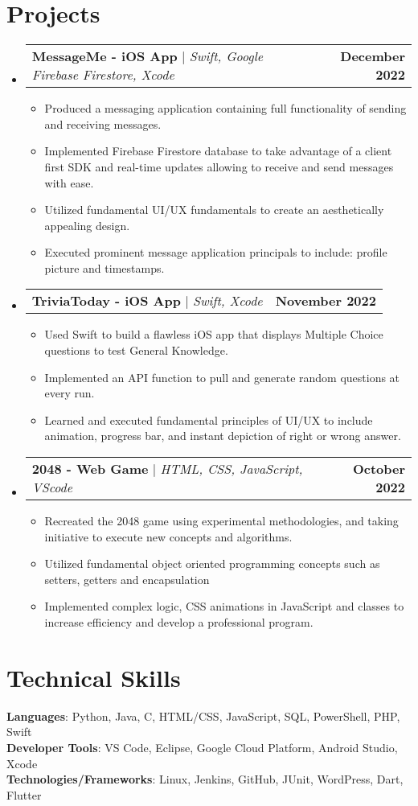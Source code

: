 \documentclass[letterpaper,11pt]{article}
\makeatletter
\newcommand{\resumeItem}[1]{
  \item\small{
    {#1 \vspace{-2pt}}
  }
}
\newcommand{\resumeProjectHeading}[2]{
    \item
    \begin{tabular*}{1.001\textwidth}{l@{\extracolsep{\fill}}r}
      \small#1 & \textbf{\small #2}\\
    \end{tabular*}\vspace{-7pt}
}
\newcommand{\resumeSubHeadingListStart}{\begin{itemize}[leftmargin=0.0in, label={}]}
\newcommand{\resumeSubHeadingListEnd}{\end{itemize}}
\newcommand{\resumeItemListStart}{\begin{itemize}}
\newcommand{\resumeItemListEnd}{\end{itemize}\vspace{-5pt}}
\makeatother
\begin{document}
\section{Projects}
    \vspace{-5pt}
    \resumeSubHeadingListStart
      \resumeProjectHeading
          {\textbf{MessageMe - iOS App} $|$ \emph{Swift, Google Firebase Firestore, Xcode}}{December 2022}
          \resumeItemListStart
            \resumeItem{Produced a messaging application containing full functionality of sending and receiving messages.}
            \resumeItem{Implemented Firebase Firestore database to take advantage of a client first SDK and real-time updates allowing to receive and send messages with ease.}
            \resumeItem{Utilized fundamental UI/UX fundamentals to create an aesthetically appealing design. }
            \resumeItem{Executed prominent message application principals to include: profile picture and timestamps.}
          \resumeItemListEnd
          \vspace{-13pt}
      \resumeProjectHeading
          {\textbf{TriviaToday - iOS App} $|$ \emph{Swift, Xcode}}{November 2022}
          \resumeItemListStart
            \resumeItem{Used Swift to build a flawless iOS app that displays Multiple Choice questions to test General Knowledge.}
            \resumeItem{Implemented an API function to pull and generate random questions at every run.}
            \resumeItem{Learned and executed fundamental principles of UI/UX to include animation, progress bar, and instant
depiction of right or wrong answer.}
          \resumeItemListEnd 
          \vspace{-13pt}
          \resumeProjectHeading
          {\textbf{2048 - Web Game} $|$ \emph{HTML, CSS, JavaScript, VScode}}{October 2022}
          \resumeItemListStart
            \resumeItem{Recreated the 2048 game using experimental methodologies, and taking initiative to execute new concepts
and algorithms.}
            \resumeItem{Utilized fundamental object oriented programming concepts such as setters, getters and encapsulation}
            \resumeItem{Implemented complex logic, CSS animations in JavaScript and classes to increase efficiency and develop a
professional program.}
          \resumeItemListEnd 
    \resumeSubHeadingListEnd
\vspace{-15pt}


%
\section{Technical Skills}
 \begin{itemize}[leftmargin=0.15in, label={}]
    \small{\item{
     \textbf{Languages}{: Python, Java, C, HTML/CSS, JavaScript, SQL, PowerShell, PHP, Swift} \\
     \textbf{Developer Tools}{: VS Code, Eclipse, Google Cloud Platform, Android Studio, Xcode} \\
     \textbf{Technologies/Frameworks}{: Linux, Jenkins, GitHub, JUnit, WordPress, Dart, Flutter} \\
    }}
 \end{itemize}
 \vspace{-16pt}
\end{document}
